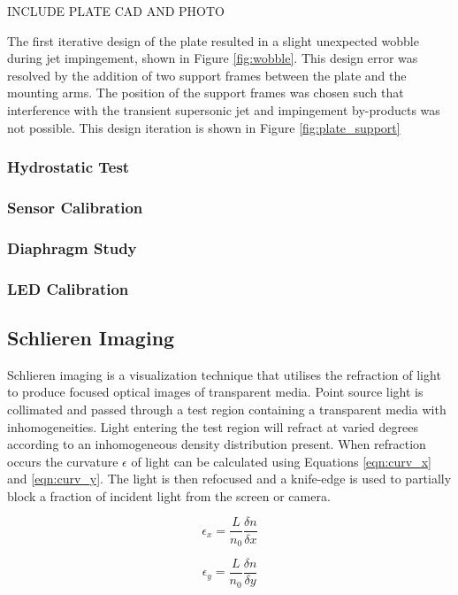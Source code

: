 INCLUDE PLATE CAD AND PHOTO

The first iterative design of the plate resulted in a slight unexpected wobble during jet impingement, shown in Figure \ref{fig:wobble}. This design error was resolved by the addition of two support frames between the plate and the mounting arms. The position of the support frames was chosen such that interference with the transient supersonic jet and impingement by-products was not possible. This design iteration is shown in Figure \ref{fig:plate_support}

\subsubsection{Hydrostatic Test}
\subsubsection{Sensor Calibration}
\subsubsection{Diaphragm Study}
\subsubsection{LED Calibration}

\subsection{Schlieren Imaging}
Schlieren imaging is a visualization technique that utilises the refraction of light to produce focused optical images of transparent media. Point source light is collimated and passed through a test region containing a transparent media with inhomogeneities. Light entering the test region will refract at varied degrees according to an inhomogeneous density distribution present. When refraction occurs the curvature $\epsilon$ of light can be calculated using Equations \ref{eqn:curv_x} and \ref{eqn:curv_y}. The light is then refocused and a knife-edge is used to partially block a fraction of incident light from the screen or camera.

\begin{equation}\label{eqn:curv_x}
\epsilon_x = \frac{L}{n_0}\frac{\delta n}{\delta x}
\end{equation}

\begin{equation}\label{eqn:curv_y}
\epsilon_y = \frac{L}{n_0}\frac{\delta n}{\delta y}
\end{equation}

